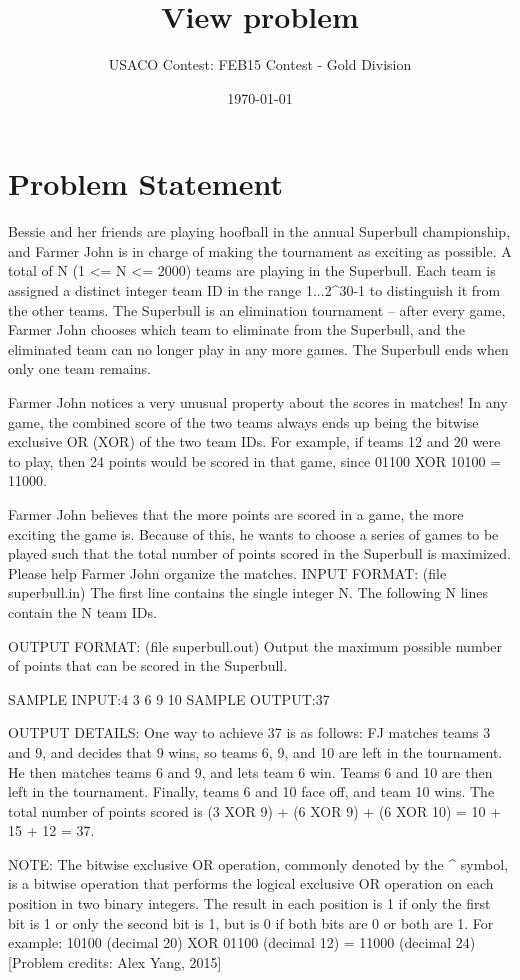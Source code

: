 \documentclass[12pt]{article}
\title{View problem}
\author{USACO Contest: FEB15 Contest - Gold Division}
\date{\today}
\begin{document}
\maketitle

\section*{Problem Statement}

Bessie and her friends are playing hoofball in the annual Superbull championship, and Farmer John is in charge of making the tournament as exciting as possible.  A total of N (1 <= N <= 2000) teams are playing in the Superbull. Each team is assigned a distinct integer team ID in the range 1...2^30-1 to distinguish it from the other teams. The Superbull is an elimination tournament -- after every game, Farmer John chooses which team to eliminate from the Superbull, and the eliminated team can no longer play in any more games. The Superbull ends when only one team remains.

Farmer John notices a very unusual property about the scores in matches! In any game, the combined score of the two teams always ends up being the bitwise exclusive OR (XOR) of the two team IDs. For example, if teams 12 and 20 were to play, then 24 points would be scored in that game, since 01100 XOR 10100 = 11000.

Farmer John believes that the more points are scored in a game, the more exciting the game is. Because of this, he wants to choose a series of games to be played such that the total number of points scored in the Superbull is maximized. Please help Farmer John organize the matches.
INPUT FORMAT: (file superbull.in)
The first line contains the single integer N.  The following N lines contain the N team IDs.

OUTPUT FORMAT: (file superbull.out)
Output the maximum possible number of points that can be scored in the Superbull.

SAMPLE INPUT:4
3
6
9
10
SAMPLE OUTPUT:37


OUTPUT DETAILS: One way to achieve 37 is as follows: FJ matches teams 3 and 9, and decides that 9 wins, so teams 6, 9, and 10 are left in the tournament. He then matches teams 6 and 9, and lets team 6 win. Teams 6 and 10 are then left in the tournament. Finally, teams 6 and 10 face off, and team 10 wins. The total number of points scored is (3 XOR 9) + (6 XOR 9) + (6 XOR 10) = 10 + 15 + 12 = 37.

NOTE: The bitwise exclusive OR operation, commonly denoted by the ^ symbol, is a bitwise operation that performs the logical exclusive OR operation on each position in two binary integers. The result in each position is 1 if only the first bit is 1 or only the second bit is 1, but is 0 if both bits are 0 or both are 1. For example: 10100 (decimal 20) XOR 01100 (decimal 12) = 11000 (decimal 24)
[Problem credits: Alex Yang, 2015]
\end{document}
